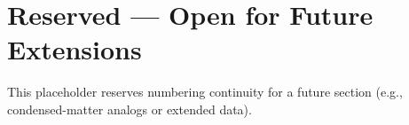\section{Reserved --- Open for Future Extensions}\label{sec:reserved-5}
This placeholder reserves numbering continuity for a future section (e.g., condensed-matter analogs or extended data).
